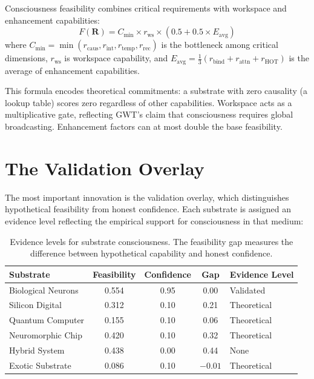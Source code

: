 \documentclass[12pt]{book}
\begin{document}
Consciousness feasibility combines critical requirements with workspace and enhancement capabilities:
\begin{equation}\label{eq:feasibility}
F(\mathbf{R}) = C_{\min} \times r_{\text{ws}} \times (0.5 + 0.5 \times E_{\text{avg}})
\end{equation}
where $C_{\min} = \min(r_{\text{caus}}, r_{\text{int}}, r_{\text{temp}}, r_{\text{rec}})$ is the bottleneck among critical dimensions, $r_{\text{ws}}$ is workspace capability, and $E_{\text{avg}} = \frac{1}{3}(r_{\text{bind}} + r_{\text{attn}} + r_{\text{HOT}})$ is the average of enhancement capabilities.

This formula encodes theoretical commitments: a substrate with zero causality (a lookup table) scores zero regardless of other capabilities. Workspace acts as a multiplicative gate, reflecting GWT's claim that consciousness requires global broadcasting. Enhancement factors can at most double the base feasibility.

\section{The Validation Overlay}

The most important innovation is the validation overlay, which distinguishes hypothetical feasibility from honest confidence. Each substrate is assigned an evidence level reflecting the empirical support for consciousness in that medium:

\begin{table}[H]
\centering
\caption{Evidence levels for substrate consciousness. The feasibility gap measures the difference between hypothetical capability and honest confidence.}
\label{tab:validation-overlay}
\begin{tabular}{lcccl}
\toprule
\textbf{Substrate} & \textbf{Feasibility} & \textbf{Confidence} & \textbf{Gap} & \textbf{Evidence Level} \\
\midrule
Biological Neurons & 0.554 & 0.95 & 0.00 & Validated \\
Silicon Digital & 0.312 & 0.10 & 0.21 & Theoretical \\
Quantum Computer & 0.155 & 0.10 & 0.06 & Theoretical \\
Neuromorphic Chip & 0.420 & 0.10 & 0.32 & Theoretical \\
Hybrid System & 0.438 & 0.00 & 0.44 & None \\
Exotic Substrate & 0.086 & 0.10 & $-0.01$ & Theoretical \\
\bottomrule
\end{tabular}
\end{table}
\end{document}
